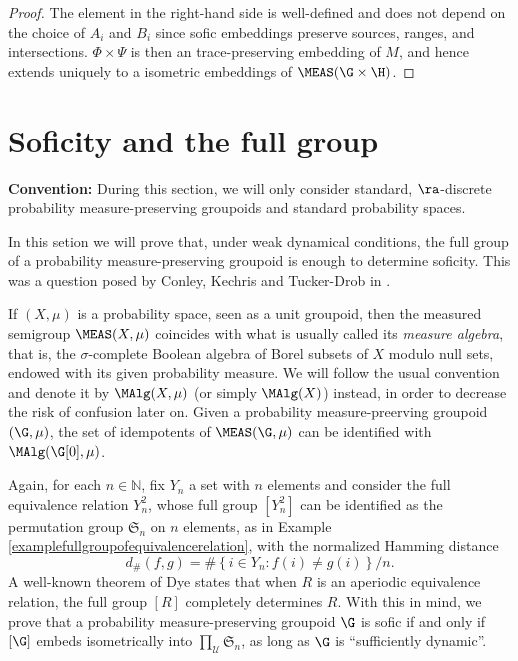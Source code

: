 \begin{proof}
The element in the right-hand side is well-defined and does not depend on the choice of $A_i$ and $B_i$ since sofic embeddings preserve sources, ranges, and intersections. $\Phi\times\Psi$ is then an trace-preserving embedding of $M$, and hence extends uniquely to a isometric embeddings of $\MEAS(\G\times\H)$.\qedhere
\end{proof}

\section{Soficity and the full group}
\nocite{MR3142029}

\textbf{Convention:} During this section, we will only consider standard, $\ra$-discrete probability measure-preserving groupoids and standard probability spaces.

In this setion we will prove that, under weak dynamical conditions, the full group of a probability measure-preserving groupoid is enough to determine soficity. This was a question posed by Conley, Kechris and Tucker-Drob in \cite{MR3035288}.

If $(X,\mu)$ is a probability space, seen as a unit groupoid, then the measured semigroup $\MEAS(X,\mu)$ coincides with what is usually called its \emph{measure algebra}, that is, the $\sigma$-complete Boolean algebra of Borel subsets of $X$ modulo null sets, endowed with its given probability measure. We will follow the usual convention and denote it by $\MAlg(X,\mu)$ (or simply $\MAlg(X)$) instead, in order to decrease the risk of confusion later on. Given a probability measure-preerving groupoid $(\G,\mu)$, the set of idempotents of $\MEAS(\G,\mu)$ can be identified with $\MAlg(\G[0],\mu)$.

Again, for each $n\in\mathbb{N}$, fix $Y_n$ a set with $n$ elements and consider the full equivalence relation $Y_n^2$, whose full group $[Y_n^2]$ can be identified as the permutation group $\mathfrak{S}_n$ on $n$ elements, as in Example \ref{examplefullgroupofequivalencerelation}, with the normalized Hamming distance
\[d_\#(f,g)=\#\left\{i\in Y_n:f(i)\neq g(i)\right\}/n.\]
A well-known theorem of Dye \cite{MR0158048} states that when $R$ is an aperiodic equivalence relation, the full group $[R]$ completely determines $R$. With this in mind, we prove that a probability measure-preserving groupoid $\G$ is sofic if and only if $[\G]$ embeds isometrically into $\prod_{\mathcal{U}}\mathfrak{S}_n$, as long as $\G$ is ``sufficiently dynamic''.

